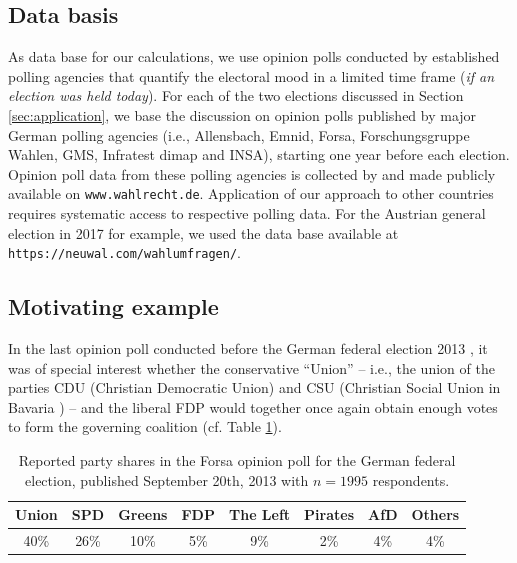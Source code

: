 \documentclass[smallcondensed]{svjour3_edited}     %
\begin{document}
\subsection{Data basis}\label{ssec:data-basis}
As data base for our calculations, we use opinion polls conducted by established
polling agencies that quantify the electoral mood in a limited time frame
(\textit{if an election was held today}). For each of the two elections discussed
in Section \ref{sec:application}, we base the discussion on opinion polls published
by major German polling agencies (i.e., Allensbach, Emnid, Forsa, Forschungsgruppe Wahlen,
GMS, Infratest dimap and INSA), starting one year before each election.
Opinion poll data from these polling agencies is collected by and made publicly available
on \texttt{www.wahlrecht.de}. Application of our approach to other countries
requires systematic access to respective polling data. For the Austrian general
election in 2017 for example, we used the data base available at
\texttt{https://neuwal.com/wahlumfragen/}.


\subsection{Motivating example}\label{ssec:intro-ex-fdp}
In the last opinion poll conducted before the German federal election 2013 \citep{forsa_2013},
it was of special interest whether the conservative ``Union'' -- i.e., the union of
the parties CDU (Christian Democratic Union) and CSU (Christian Social Union in Bavaria ) --
and the liberal FDP would together once again obtain enough votes to form the
governing coalition (cf. Table \ref{tab_fdp}).

\begin{table}[!ht]\centering
\caption{Reported party shares in the Forsa opinion poll for the German federal
election, published September 20th, 2013 with $n=1995$ respondents.
\label{tab_fdp}
}
\medskip
\begin{tabular}{cccccccc}
\toprule[0.09 em]
Union & SPD & Greens & FDP & The Left & Pirates & AfD & Others \\
\midrule
40\% & 26\% & 10\% & 5\% & 9\% & 2\% & 4\% & 4\% \\
\bottomrule[0.09 em]
\end{tabular}
\end{table}
\end{document}
